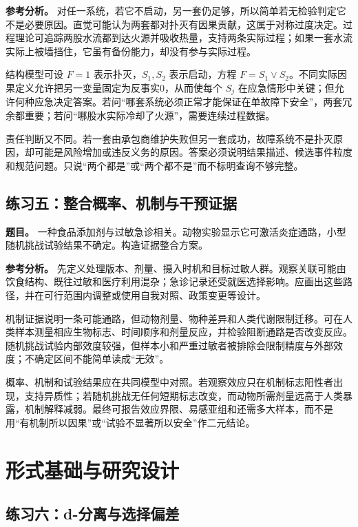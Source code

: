 \textbf{参考分析。} 对任一系统，若它不启动，另一套仍足够，所以简单若无检验判定它不是必要原因。直觉可能认为两套都对扑灭有因果贡献，这属于对称过度决定。过程理论可追踪两股水流都到达火源并吸收热量，支持两条实际过程；如果一套水流实际上被墙挡住，它虽有备份能力，却没有参与实际过程。

结构模型可设 $F=1$ 表示扑灭，$S_1,S_2$ 表示启动，方程 $F=S_1\lor S_2$。不同实际因果定义允许把另一变量固定为反事实0，从而使每个 $S_j$ 在应急情形中关键；但允许何种应急决定答案。若问“哪套系统必须正常才能保证在单故障下安全”，两套冗余都重要；若问“哪股水实际冷却了火源”，需要连续过程数据。

责任判断又不同。若一套由承包商维护失败但另一套成功，故障系统不是扑灭原因，却可能是风险增加或违反义务的原因。答案必须说明结果描述、候选事件粒度和规范问题。只说“两个都是”或“两个都不是”而不标明查询不够完整。

\subsection*{练习五：整合概率、机制与干预证据}

\textbf{题目。} 一种食品添加剂与过敏急诊相关。动物实验显示它可激活炎症通路，小型随机挑战试验结果不确定。构造证据整合方案。

\textbf{参考分析。} 先定义处理版本、剂量、摄入时机和目标过敏人群。观察关联可能由饮食结构、既往过敏和医疗利用混杂；急诊记录还受就医选择影响。应画出这些路径，并在可行范围内调整或使用自我对照、政策变更等设计。

机制证据说明一条可能通路，但动物剂量、物种差异和人类代谢限制迁移。可在人类样本测量相应生物标志、时间顺序和剂量反应，并检验阻断通路是否改变反应。随机挑战试验内部效度较强，但样本小和严重过敏者被排除会限制精度与外部效度；不确定区间不能简单读成“无效”。

概率、机制和试验结果应在共同模型中对照。若观察效应只在机制标志阳性者出现，支持异质性；若随机挑战无任何短期标志改变，而动物所需剂量远高于人类暴露，机制解释减弱。最终可报告效应界限、易感亚组和还需多大样本，而不是用“有机制所以因果”或“试验不显著所以安全”作二元结论。

\section{形式基础与研究设计}

\subsection*{练习六：d-分离与选择偏差}

